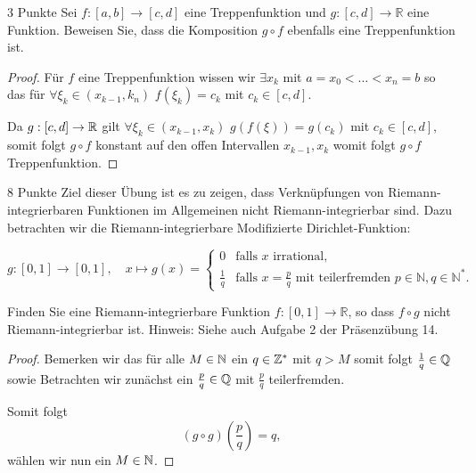 \documentclass{problemset}
\begin{document}
\begin{problem}{3 Punkte}
Sei $f: [a, b] \to [c, d]$ eine Treppenfunktion und $g: [c, d] \to \mathbb{R}$ eine Funktion. Beweisen Sie, dass die Komposition $g \circ f$ ebenfalls eine Treppenfunktion ist.

\begin{proof}
    Für $f$ eine Treppenfunktion wissen wir $\exists x_k$ mit $a = x_0 < \dots < x_n = b$ so das für $\forall \xi_k \in (x_{k-1}, k_n)$ $f(\xi_k) = c_k$ mit $c_k \in [c,d]$.

    Da $g: [c,d] \rightarrow \mathbb{R}$ gilt $\forall \xi_k \in (x_{k-1}, x_k)$
    $g(f(\xi)) = g(c_k)$ mit $c_k \in [c,d]$, somit folgt $g \circ f$ konstant
    auf den offen Intervallen $x_{k-1}, x_k$ womit folgt $g \circ f$
    Treppenfunktion.
\end{proof}

\end{problem}

\begin{problem}{8 Punkte}
Ziel dieser Übung ist es zu zeigen, dass Verknüpfungen von Riemann-integrierbaren Funktionen im Allgemeinen nicht Riemann-integrierbar sind. Dazu betrachten wir die Riemann-integrierbare Modifizierte Dirichlet-Funktion:

\[ g: [0, 1] \to [0, 1], \quad x \mapsto g(x) = \begin{cases}
        0           & \text{falls } x \text{ irrational},                                                            \\
        \frac{1}{q} & \text{falls } x = \frac{p}{q} \text{ mit teilerfremden } p \in \mathbb{N}, q \in \mathbb{N}^*.
    \end{cases} \]

Finden Sie eine Riemann-integrierbare Funktion $f: [0, 1] \to \mathbb{R}$, so
dass $f \circ g$ nicht Riemann-integrierbar ist. Hinweis: Siehe auch Aufgabe 2
der Präsenzübung 14.

\begin{proof}
    Bemerken wir das für alle $M \in \mathbb{N}$ ein $q \in \mathbb{Z}^*$ mit $q > M$ somit folgt $\frac{1}{q} \in \mathbb{Q}$ sowie
    Betrachten wir zunächst ein $\frac{p}{q} \in \mathbb{Q}$ mit $\frac{p}{q}$ teilerfremden.

    Somit folgt \[
        (g \circ g)\left(\frac{p}{q}\right) = q,
    \] wählen wir nun ein $M \in \mathbb{N}$.
\end{proof}

\end{problem}
\end{document}
